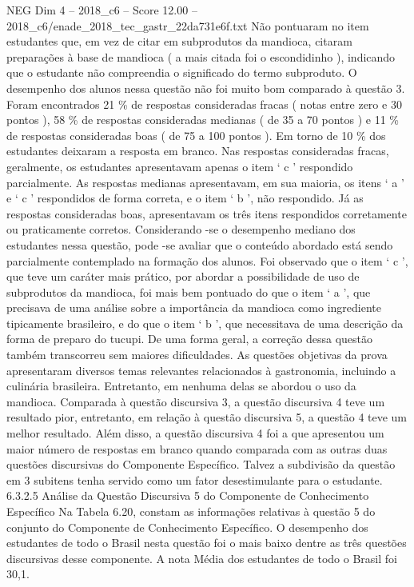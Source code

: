 \begin{textsample}{NEG Dim 4 – 2018\_c6 – Score 12.00 – 2018\_c6/enade\_2018\_tec\_gastr\_22da731e6f.txt}
Não pontuaram no item estudantes que, em vez de citar em subprodutos da mandioca, citaram preparações à base de mandioca ( a mais citada foi o escondidinho ), indicando que o estudante não compreendia o significado do termo subproduto.
O desempenho dos alunos nessa questão não foi muito bom comparado à questão 3.
Foram encontrados 21 \% de respostas consideradas fracas ( notas entre zero e 30 pontos ), 58 \% de respostas consideradas medianas ( de 35 a 70 pontos ) e 11 \% de respostas consideradas boas ( de 75 a 100 pontos ).
Em torno de 10 \% dos estudantes deixaram a resposta em branco.
Nas respostas consideradas fracas, geralmente, os estudantes apresentavam apenas o item ‘ c ’ respondido parcialmente.
As respostas medianas apresentavam, em sua maioria, os itens ‘ a ’ e ‘ c ’ respondidos de forma correta, e o item ‘ b ’, não respondido.
Já as respostas consideradas boas, apresentavam os três itens respondidos corretamente ou praticamente corretos.
Considerando -se o desempenho mediano dos estudantes nessa questão, pode -se avaliar que o conteúdo abordado está sendo parcialmente contemplado na formação dos alunos.
Foi observado que o item ‘ c ’, que teve um caráter mais prático, por abordar a possibilidade de uso de subprodutos da mandioca, foi mais bem pontuado do que o item ‘ a ’, que precisava de uma análise sobre a importância da mandioca como ingrediente tipicamente brasileiro, e do que o item ‘ b ’, que necessitava de uma descrição da forma de preparo do tucupi.
De uma forma geral, a correção dessa questão também transcorreu sem maiores dificuldades.
As questões objetivas da prova apresentaram diversos temas relevantes relacionados à gastronomia, incluindo a culinária brasileira.
Entretanto, em nenhuma delas se abordou o uso da mandioca.
Comparada à questão discursiva 3, a questão discursiva 4 teve um resultado pior, entretanto, em relação à questão discursiva 5, a questão 4 teve um melhor resultado.
Além disso, a questão discursiva 4 foi a que apresentou um maior número de respostas em branco quando comparada com as outras duas questões discursivas do Componente Específico.
Talvez a subdivisão da questão em 3 subitens tenha servido como um fator desestimulante para o estudante. 6.3.2.5 Análise da Questão Discursiva 5 do Componente de Conhecimento Específico Na Tabela 6.20, constam as informações relativas à questão 5 do conjunto do Componente de Conhecimento Específico.
O desempenho dos estudantes de todo o Brasil nesta questão foi o mais baixo dentre as três questões discursivas desse componente.
A nota Média dos estudantes de todo o Brasil foi 30,1.

\end{textsample}
